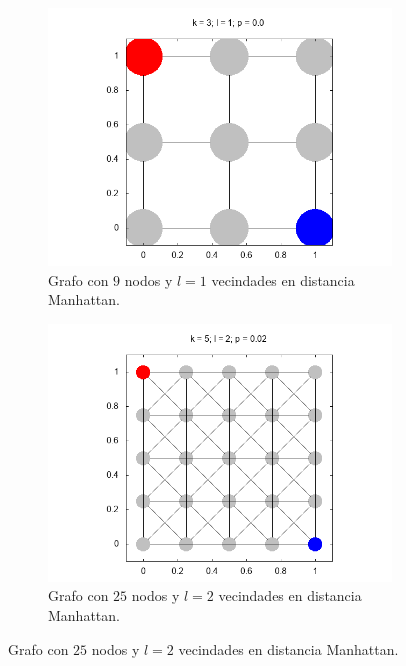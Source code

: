 \documentclass{article}
\begin{document}
  \begin{figure}[h] %
    \centering
    \begin{subfigure}[b]{0.45\textwidth}
      \includegraphics[width=\textwidth]{k009l001p000}
      \caption{Grafo con $9$ nodos y $l = 1$ vecindades en distancia Manhattan.}
      \label{fig:a}
    \end{subfigure}
    \begin{subfigure}[b]{0.45\textwidth}
      \includegraphics[width=\textwidth]{k025l002p020}
      \caption{Grafo con $25$ nodos y $l = 2$ vecindades en distancia Manhattan.}
      \label{fig:b}
    \end{subfigure}


\end{figure}
\end{document}
